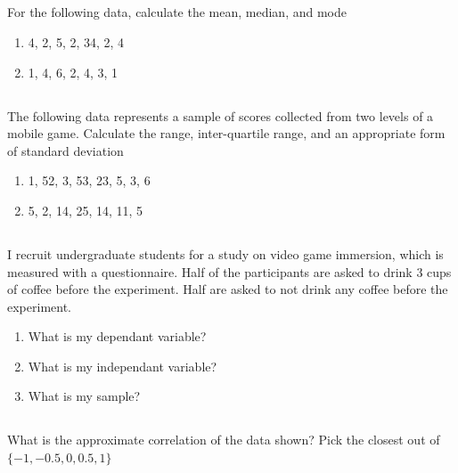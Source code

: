 \documentclass[twocolumn]{article}
\begin{document}
\subsection{}

    For the following data, calculate the mean, median, and mode

    \begin{enumerate}
        \item 4, 2, 5, 2, 34, 2, 4
        \item 1, 4, 6, 2, 4, 3, 1
    \end{enumerate}

\subsection{}

    The following data represents a sample of scores collected from two levels of a mobile game. Calculate the range, inter-quartile range, and an appropriate form of standard deviation 

    \begin{enumerate}
        \item 1, 52, 3, 53, 23, 5, 3, 6
        \item 5, 2, 14, 25, 14, 11, 5
    \end{enumerate}

\subsection{}

    I recruit undergraduate students for a study on video game immersion, which is measured with a questionnaire. Half of the participants are asked to drink 3 cups of coffee before the experiment. Half are asked to not drink any coffee before the experiment.
    
    \begin{enumerate}
        \item What is my dependant variable?
        \item What is my independant variable?
        \item What is my sample?
    \end{enumerate}

\subsection{}

    What is the approximate correlation of the data shown? Pick the closest out of $\{-1, -0.5, 0, 0.5, 1\}$
\end{document}
